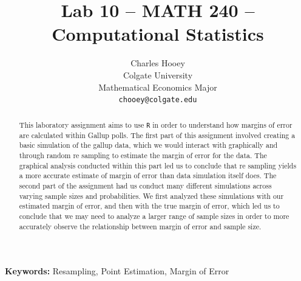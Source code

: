 \documentclass{article}\usepackage[]{graphicx}\usepackage[]{xcolor}
\begin{document}
\vspace{-1in}
\title{Lab 10 -- MATH 240 -- Computational Statistics}

\author{
  Charles Hooey \\
  Colgate University  \\
  Mathematical Economics Major  \\
  {\tt chooey@colgate.edu}
}

\date{}

\maketitle

\begin{multicols}{2}
\begin{abstract}
This laboratory assignment aims to use \texttt{R} in order to understand how margins of error are calculated within Gallup polls. The first part of this assignment involved creating a basic simulation of the gallup data, which we would interact with graphically and through random re sampling to estimate the margin of error for the data. The graphical analysis conducted within this part led us to conclude that re sampling yields a more accurate estimate of margin of error than data simulation itself does. The second part of the assignment had us conduct many different simulations across varying sample sizes and probabilities. We first analyzed these simulations with our estimated margin of error, and then with the true margin of error, which led us to conclude that we may need to analyze a larger range of sample sizes in order to more accurately observe the relationship between margin of error and sample size.
\end{abstract}

\noindent \textbf{Keywords:} Resampling, Point Estimation, Margin of Error


\end{multicols}
\end{document}
